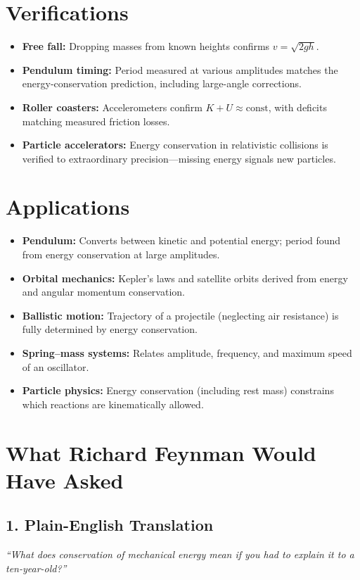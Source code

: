 \section*{Verifications}

\begin{itemize}
\item \textbf{Free fall:} Dropping masses from known heights confirms $v = \sqrt{2gh}$.
\item \textbf{Pendulum timing:} Period measured at various amplitudes matches the energy-conservation prediction, including large-angle corrections.
\item \textbf{Roller coasters:} Accelerometers confirm $K + U \approx \text{const}$, with deficits matching measured friction losses.
\item \textbf{Particle accelerators:} Energy conservation in relativistic collisions is verified to extraordinary precision---missing energy signals new particles.
\end{itemize}
\section*{Applications}

\begin{itemize}
\item \textbf{Pendulum:} Converts between kinetic and potential energy; period found from energy conservation at large amplitudes.
\item \textbf{Orbital mechanics:} Kepler's laws and satellite orbits derived from energy and angular momentum conservation.
\item \textbf{Ballistic motion:} Trajectory of a projectile (neglecting air resistance) is fully determined by energy conservation.
\item \textbf{Spring--mass systems:} Relates amplitude, frequency, and maximum speed of an oscillator.
\item \textbf{Particle physics:} Energy conservation (including rest mass) constrains which reactions are kinematically allowed.
\end{itemize}
\section*{What Richard Feynman Would Have Asked}

\subsection*{1. Plain-English Translation}
\textit{``What does conservation of mechanical energy mean if you had to explain it to a ten-year-old?''}

